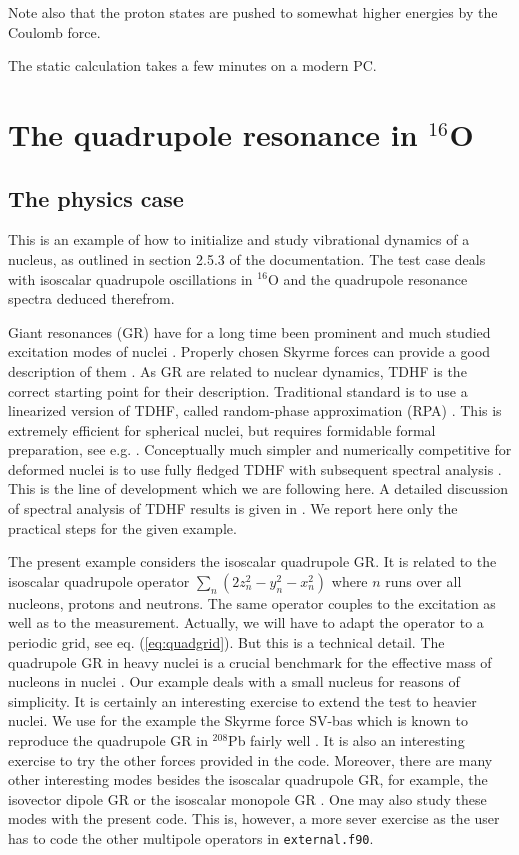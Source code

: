 \documentclass[A4]{elsarticle}
\begin{document}
Note also that the proton states are pushed to somewhat higher
energies by the Coulomb force. 

The static calculation takes a few minutes on a modern PC.

\section{The quadrupole resonance in $^{16}$O}
\subsection{The physics case}

This is an example of how to initialize and study vibrational dynamics
of a nucleus, as outlined in section 2.5.3 of the documentation. The
test case deals with isoscalar quadrupole oscillations in  $^{16}$O and the
quadrupole resonance spectra deduced therefrom.

Giant resonances (GR) have for a long time been
prominent and much studied excitation modes of nuclei \cite{Goe82aR}.
Properly chosen Skyrme forces can provide a good description of them
\cite{Ben03aR,Klu09a}. As GR are related to nuclear dynamics, TDHF is
the correct starting point for their description. Traditional standard
is to use a linearized version of TDHF, called random-phase
approximation (RPA) \cite{Row70aB,Bro71aB}. This is extremely
efficient for spherical nuclei, but requires formidable formal
preparation, see e.g. \cite{Rei92a}. Conceptually much simpler and
numerically competitive for deformed nuclei is to use fully fledged
TDHF with subsequent spectral analysis \cite{Yab96,Cal97a}. This is
the line of development which we are following here. A detailed
discussion of spectral analysis of TDHF results is given in
\cite{Cal97a}. We report here only the practical steps for the given
example.

The present example considers the isoscalar quadrupole GR. It is
related to the isoscalar quadrupole operator
$\sum_n(2z_n^2-y_n^2-x_n^2)$ where $n$ runs over all nucleons, protons
and neutrons. The same operator couples to the excitation as well as
to the measurement. Actually, we will have to adapt the operator to a
periodic grid, see eq. (\ref{eq:quadgrid}). But this is a technical
detail. The quadrupole GR in heavy nuclei is a crucial benchmark for
the effective mass of nucleons in nuclei \cite{Boh79aR,Bar82a}. Our
example deals with a small nucleus for reasons of simplicity. It is
certainly an interesting exercise to extend the test to heavier
nuclei. We use for the example the Skyrme force SV-bas which is known
to reproduce the quadrupole GR in $^{208}$Pb fairly well
\cite{Klu09a}. It is also an interesting exercise to try the other
forces provided in the code.  Moreover, there are many other
interesting modes besides the isoscalar quadrupole GR, for example,
the isovector dipole GR or the isoscalar monopole GR
\cite{Boh79aR,Goe82aR}. One may also study these modes with the
present code. This is, however, a more sever exercise as the user has
to code the other multipole operators in {\tt external.f90}.
\end{document}
